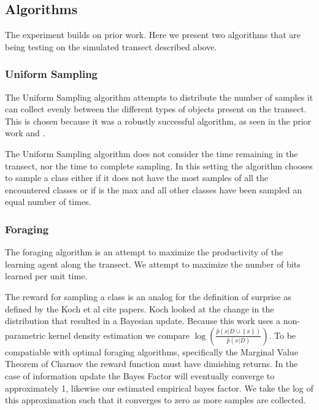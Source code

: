 \subsection{Algorithms}


	The experiment builds on prior work.  Here we present two algorithms that are being testing on the simulated transect described above.

\subsubsection{Uniform Sampling}

The Uniform Sampling algorithm attempts to distribute the number of samples it
can collect evenly between the different types of objects present on the
transect.  This is chosen because it was a robustly successful algorithm, as
seen in the prior work \cite{furlong2014sequential} and \cite{furlong2014budgeting}.

The Uniform Sampling algorithm does not consider the time remaining in the
transect, nor the time to complete sampling.  In this setting the algorithm
chooses to sample a class either if it does not have the most samples of all
the encountered classes or if is the max and all other classes have been
sampled an equal number of times.

\subsubsection{Foraging}

The foraging algorithm is an attempt to maximize the productivity of the learning agent along the transect.  We attempt to maximize the number of bits learned per unit time.

The reward for sampling a class is an analog for the definition of surprise as
defined by the Koch et al {cite papers}.  Koch looked at the change in the
distribution that resulted in a Bayesian update.  Because this work uses a
non-parametric kernel density estimation we compare
$\log\left(\frac{\hat{p}(x|D\cup \left\{x\right\})}{\hat{p}(x|D)}\right)$.  To
be compatiable with optimal foraging algorithms, specifically the Marginal
Value Theorem of Charnov \cite{charnov1973optimal} the reward function must
have dimishing returns.  In the case of information update the Bayes Factor
will eventually converge to approximately 1, likewise our estimated empirical
bayes factor.  We take the log of this approximation such that it converges to
zero as more samples are collected.


